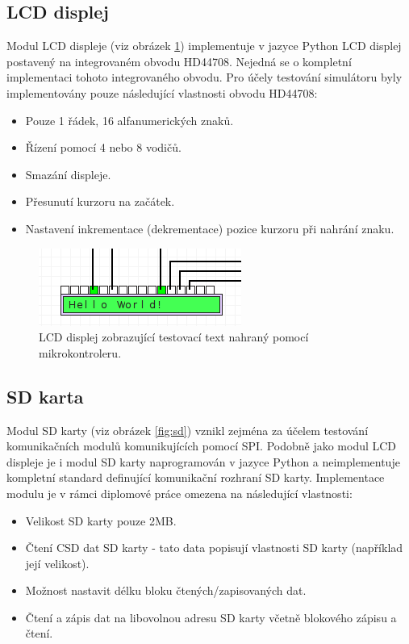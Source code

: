 \subsection{LCD displej}

Modul LCD displeje (viz obrázek \ref{fig:lcd}) implementuje v jazyce Python LCD displej postavený na integrovaném obvodu HD44708. Nejedná se o kompletní implementaci tohoto integrovaného obvodu. Pro účely testování simulátoru byly implementovány pouze následující vlastnosti obvodu HD44708:

\begin{itemize}
\item Pouze 1 řádek, 16 alfanumerických znaků.
\item Řízení pomocí 4 nebo 8 vodičů.
\item Smazání displeje.
\item Přesunutí kurzoru na začátek.
\item Nastavení inkrementace (dekrementace) pozice kurzoru při nahrání znaku.
\end{itemize}

\begin{figure}[ht]
\centering
\includegraphics[trim=0cm 0cm 0cm 0cm, scale=1]{fig/lcd}
\caption{LCD displej zobrazující testovací text nahraný pomocí mikrokontroleru.}
\label{fig:lcd}
\end{figure}

\subsection{SD karta}

Modul SD karty (viz obrázek \ref{fig:sd}) vznikl zejména za účelem testování komunikačních modulů komunikujících pomocí SPI. Podobně jako modul LCD displeje je i modul SD karty naprogramován v jazyce Python a neimplementuje kompletní standard definující komunikační rozhraní SD karty. Implementace modulu je v rámci diplomové práce omezena na následující vlastnosti:

\begin{itemize}
\item Velikost SD karty pouze 2MB.
\item Čtení CSD dat SD karty - tato data popisují vlastnosti SD karty (například její velikost).
\item Možnost nastavit délku bloku čtených/zapisovaných dat.
\item Čtení a zápis dat na libovolnou adresu SD karty včetně blokového zápisu a čtení.
\end{itemize}

